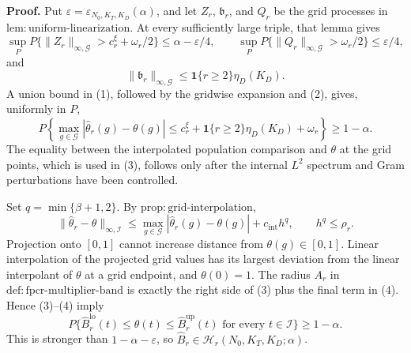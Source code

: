 \textbf{Proof.}
Put \(\varepsilon=\varepsilon_{N_0,K_T,K_D}(\alpha)\), and let \(Z_r\),
\(\mathfrak b_r\), and \(Q_r\) be the grid processes in
\(\mathrm{lem:uniform\mbox{-}linearization}\).  At every sufficiently large
triple, that lemma gives
\[
 \sup_P P\{\|Z_r\|_{\infty,\mathcal G}>c_r^\xi+\omega_r/2\}
 \le\alpha-\varepsilon/4,
 \qquad
 \sup_P P\{\|Q_r\|_{\infty,\mathcal G}>\omega_r/2\}
 \le\varepsilon/4,                                          \tag{1}
\]
and
\[
 \|\mathfrak b_r\|_{\infty,\mathcal G}
 \le\mathbf 1\{r\ge2\}\eta_D(K_D).                         \tag{2}
\]
A union bound in (1), followed by the gridwise expansion and (2), gives,
uniformly in \(P\),
\[
 P\!\left\{
 \max_{g\in\mathcal G}|\widehat\theta_r(g)-\theta(g)|
 \le c_r^\xi+\mathbf 1\{r\ge2\}\eta_D(K_D)+\omega_r
 \right\}\ge1-\alpha.                                       \tag{3}
\]
The equality between the interpolated population comparison and \(\theta\)
at the grid points, which is used in (3), follows only after the internal
\(L^2\) spectrum and Gram perturbations have been controlled.

Set \(q=\min\{\beta+1,2\}\).  By
\(\mathrm{prop:grid\mbox{-}interpolation}\),
\[
 \|\widehat\theta_r-\theta\|_{\infty,\mathcal I}
 \le\max_{g\in\mathcal G}|\widehat\theta_r(g)-\theta(g)|
 +c_{\mathrm{int}}h^q,
 \qquad h^q\le\rho_r.                                      \tag{4}
\]
Projection onto \([0,1]\) cannot increase distance from
\(\theta(g)\in[0,1]\).  Linear interpolation of the projected grid values
has its largest deviation from the linear interpolant of \(\theta\) at a
grid endpoint, and \(\theta(0)=1\).  The radius \(A_r\) in
\(\mathrm{def:fpcr\mbox{-}multiplier\mbox{-}band}\) is exactly the right
side of (3) plus the final term in (4).  Hence (3)--(4) imply
\[
 P\{\widehat B_r^{\mathrm{lo}}(t)\le\theta(t)\le
       \widehat B_r^{\mathrm{up}}(t)
       \text{ for every }t\in\mathcal I\}\ge1-\alpha.       \tag{5}
\]
This is stronger than \(1-\alpha-\varepsilon\), so
\(\widehat B_r\in\mathcal H_r(N_0,K_T,K_D;\alpha)\).

